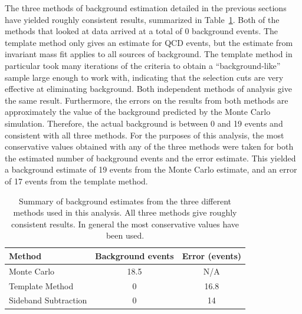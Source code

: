 The three methods of background estimation 
detailed in the previous sections have yielded 
roughly consistent results, 
summarized in Table~\ref{TableBGSub}.  
Both of the methods 
that looked at data arrived at a total 
of 0 background events.  
The template method only gives an estimate for 
QCD events, 
but the estimate from invariant mass fit 
applies to all sources of background.  
The template method in particular 
took many iterations of the criteria 
to obtain a ``background-like'' sample 
large enough to work with, 
indicating 
that the selection 
cuts are very effective at eliminating background.  
Both independent 
methods of analysis give the same result.  
Furthermore, the errors on the results from 
both methods 
are approximately the value of the background 
predicted by the Monte Carlo simulation.  
Therefore, the actual background %
is between 0 and 19 events 
and consistent with 
all three methods.  
For the purposes of this analysis, 
the most conservative values obtained 
with any of the three methods were 
taken for both the estimated number 
of background events and the error estimate.  
This yielded a background estimate of 
19 events from the Monte Carlo estimate, 
and an error of 17 events from the template method.  

\begin{table}[htbp]
  \begin{center}
    \caption[\fixspacing Summary of background estimates from different methods]{
      \fixspacing Summary of background estimates from the three 
      different methods used in this analysis.  
      All three methods give roughly consistent results.  
      In general the most conservative values have been used.  
    }
    \label{TableBGSub}
    \begin{tabular}[]{ | l | c | c | }
      \hline
      Method & Background events & Error (events)  \\ \hline \hline
      Monte Carlo & 18.5 & N/A \\ \hline 
      Template Method & 0 & 16.8 \\ \hline 
      Sideband Subtraction & 0 & 14 \\ \hline 
    \end{tabular}
  \end{center}
\end{table}


